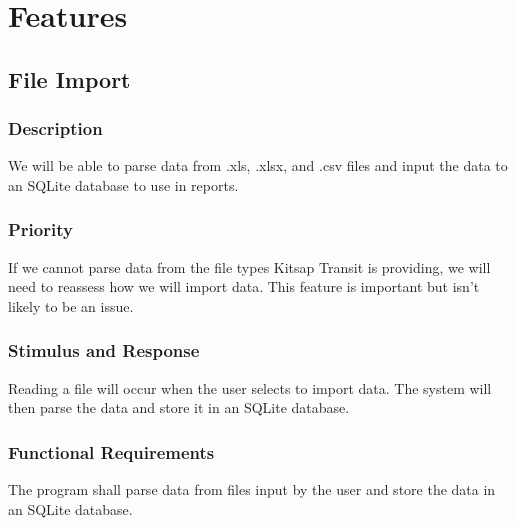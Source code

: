 \section{Features}


\subsection{File Import}
\subsubsection{Description}
We will be able to parse data from .xls, .xlsx, and .csv files and input the data to an SQLite database to use in reports.

\subsubsection{Priority}
If we cannot parse data from the file types Kitsap Transit is providing, we will need to reassess how we will import data. This feature is important but isn't likely to be an issue.

\subsubsection{Stimulus and Response}
Reading a file will occur when the user selects to import data. The system will then parse the data and store it in an SQLite database.

\subsubsection{Functional Requirements}
The program shall parse data from files input by the user and store the data in an SQLite database. 


